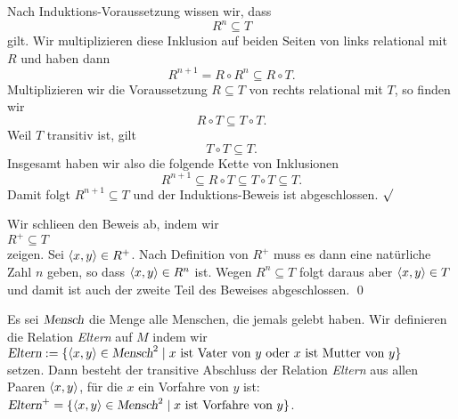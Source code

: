\begin{enumerate}
\begin{enumerate}
             Nach Induktions-Voraussetzung wissen wir, dass
              \[ R^n \subseteq T \]
             gilt.
             Wir multiplizieren diese Inklusion auf beiden Seiten von links relational mit $R$
             und haben dann
             \[ R^{n+1} = R \circ R^n \subseteq R \circ T. \]
             Multiplizieren wir die Voraussetzung $R \subseteq T$ von rechts relational mit
             $T$, so finden wir
             \[ R \circ T \subseteq T \circ T. \]
             Weil $T$ transitiv ist, gilt 
             \[ T \circ T \subseteq T. \]
             Insgesamt haben wir also die folgende Kette von Inklusionen
             \[ R^{n+1} \subseteq R \circ T \subseteq T \circ T \subseteq T. \]
             Damit folgt $R^{n+1} \subseteq T$ und der Induktions-Beweis ist
             abgeschlossen. $\surd$
\end{enumerate}
Wir schlie\3en den Beweis ab, indem wir
\\[0.2cm]
\hspace*{1.3cm}
 $R^+ \subseteq T$ 
\\[0.2cm]
zeigen.  Sei $\pair(x,y) \in R^+$.
Nach Definition von $R^+$ muss es dann eine  nat\"{u}rliche Zahl $n$ geben, so
dass $\pair(x,y) \in R^n$ ist.  Wegen $R^n \subseteq T$ folgt daraus aber
$\pair(x,y) \in T$ und damit ist auch der zweite Teil des Beweises abgeschlossen. \qed
\end{enumerate}

\example
Es sei $\textsl{Mensch}$ die Menge alle Menschen, die jemals gelebt haben.  Wir definieren
die Relation \textsl{Eltern} auf $M$ indem wir 
\\[0.2cm]
\hspace*{1.3cm}
$\textsl{Eltern} := \{ \pair(x,y) \in \textsl{Mensch}^2 \mid \mbox{$x$ ist Vater von $y$ oder 
                                                                   $x$ ist Mutter von $y$} \}$
\\[0.2cm]
setzen.  Dann besteht der transitive Abschluss der Relation \textsl{Eltern} aus allen Paaren 
$\pair(x,y)$, f\"{u}r die $x$ ein Vorfahre von $y$ ist:
\\[0.2cm]
\hspace*{1.3cm}
$\textsl{Eltern}^+ = \{ \pair(x,y) \in \textsl{Mensch}^2 \mid \mbox{$x$ ist Vorfahre von $y$} \}$.
\eox
\pagebreak

